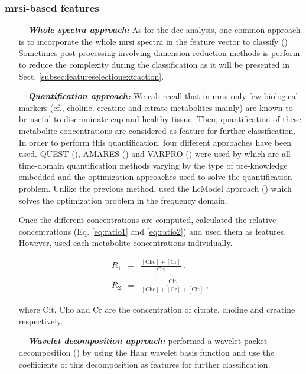 \subsubsection{\ac{mrsi}-based features}

\begin{enumerate}[leftmargin=*]

\item[$-$] \textbf{\textit{Whole spectra approach:}} As for the \ac{dce} analysis, one common approach is to incorporate the whole \ac{mrsi} spectra in the feature vector to classify (\cite{Kelm2007,Parfait2012,Tiwari2007,Tiwari2009,Tiwari2013,Tiwari2009a,Tiwari2010,Viswanath2008a,Matulewicz2013}) Sometimes post-processing involving dimension reduction methods is perform to reduce the complexity during the classification as it will be presented in Sect. \ref{subsec:featureselectionextraction}.

\item[$-$] \textbf{\textit{Quantification approach:}} We cab recall that in \ac{mrsi} only few biological markers (cf., choline, creatine and citrate metabolites mainly) are known to be useful to discriminate \ac{cap} and healthy tissue. Then, quantification of these metabolite concentrations are considered as feature for further classification. In order to perform this quantification, four different approaches have been used. QUEST (\cite{Ratiney2005}), AMARES (\cite{Vanhamme1997}) and VARPRO (\cite{Coleman1993}) were used by \cite{Kelm2007} which are all time-domain quantification methods varying by the type of pre-knowledge embedded and the optimization approaches used to solve the quantification problem. Unlike the previous method, \cite{Parfait2012} used the LcModel approach (\cite{Provencher1993}) which solves the optimization problem in the frequency domain.

Once the different concentrations are computed, \cite{Kelm2007} calculated the relative concentrations (Eq. \eqref{eq:ratio1} and \eqref{eq:ratio2}) and used them as features. However, \cite{Parfait2012} used each metabolite concentrations individually.

\begin{eqnarray}
	R_1 & = & \frac{ [ \text{Cho} ] + [ \text{Cr} ]}{[ \text{Cit} ]} \ . \label{eq:ratio1} \\
	R_2 & = & \frac{[ \text{Cit} ]}{[\text{Cho}]+[\text{Cr}]+[\text{Cit}]} \ , \label{eq:ratio2}
\end{eqnarray}

\noindent where $\text{Cit}$, $\text{Cho}$ and $\text{Cr}$ are the concentration of citrate, choline and creatine respectively.

\item[$-$] \textbf{\textit{Wavelet decomposition approach:}} \cite{Tiwari2012} performed a wavelet packet decomposition (\cite{Coifman1992}) by using the Haar wavelet basis function and use the coefficients of this decomposition as features for further classification.

\end{enumerate}